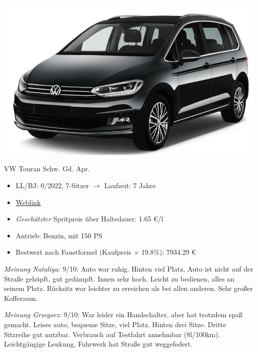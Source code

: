 \documentclass[landscape, DIV=99, 14pt]{scrartcl}
\begin{document}
\pagebreak
\begin{center}
\includegraphics[width=0.9\columnwidth]{cars/vw-touran.png}

VW Touran Schw. Gd. Apr.
\end{center}

\begin{itemize}
    \item LL/BJ: 0/2022, 7-Sitzer $\rightarrow$ Laufzeit: 7 Jahre
    \item \href{https://www.volkswagen.de/de/konfigurator.html/__app/touran/touran/comfortline.app?buildabilityStatus-app=buildable&category-app=private&carlineId-app=31000&salesGroupId-app=32600&trimName-app=Comfortline&modelId-app=5T13PZ%24GYORYOR&modelVersion-app=3&modelYear-app=2022&exteriorId-app=F14+5K5K&interiorId-app=F56+++++VE&options-app=MSTD7B2-GPG4PG4-MESSU9C-GPJ9PJ9-GPF6PF6-GPKJPKJ-GPLLPLL-MHKAKH7-GWLLWLL-GWL2WL2-GPM3PM3-GRBDRBD-MTRW3CX-MKSUKA1-MSAB4X4-GP19P19-GWQ1WQ1-GWWCWWC}{Weblink}
    \item \emph{Gesch\"atzter} Spritpreis \"uber Haltedauer: 1.65 \euro{}/l
    \item Antrieb: Benzin, mit 150 PS
    \item Restwert nach Faustformel (Kaufpreis $\times$ 19.8\%): 7934.29 \euro{}
\end{itemize}

\begin{small}
\emph{Meinung Nataliya:} 9/10: Auto war ruhig. Hinten viel Platz, Auto ist nicht auf der Straße gehüpft,
                    gut gedämpft. Innen sehr hoch. Leicht zu bedienen, alles an seinem Platz. Rücksitz
                    war leichter zu erreichen als bei allen anderen. Sehr großer Kofferaum.
        
\emph{Meinung Grzegorz:} 9/10: War leider ein Handschalter, aber hat trotzdem spaß gemacht. 
                   Leises auto, bequeme Sitze, viel Platz. Hinten drei Sitze. Dritte Sitzreihe gut nutzbar.
                   Verbrauch auf Testfahrt annehmbar (8l/100km). Leichtgängige Lenkung, Fahrwerk hat Straße 
                   gut weggefedert.
\end{small}
\end{document}
